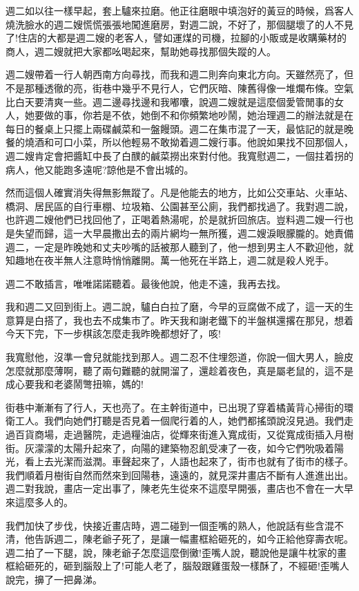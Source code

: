 \documentclass[a6paper]{article}
\begin{document}
週二如以往一樣早起，套上驢來拉磨。他正往磨眼中填泡好的黃豆的時候，爲客人燒洗臉水的週二嫂慌慌張張地闖進磨房，對週二說，不好了，那個腿壞了的人不見了!住店的大都是週二嫂的老客人，譬如運煤的司機，拉腳的小販或是收購藥材的商人，週二嫂就把大家都吆喝起來，幫助她尋找那個失蹤的人。

週二嫂帶着一行人朝西南方向尋找，而我和週二則奔向東北方向。天雖然亮了，但不是那種透徹的亮，街巷中幾乎不見行人，它們灰暗、陳舊得像一堆爛布條。空氣比白天要清爽一些。週二邊尋找邊和我嘟囔，說週二嫂就是這麼個愛管閒事的女人，她要做的事，你若是不依，她倒不和你頻繁地吵鬧，她治理週二的辦法就是在每日的餐桌上只擺上兩碟鹹菜和一盤饅頭。週二在集市混了一天，最惦記的就是晚餐的燒酒和可口小菜，所以他輕易不敢拗着週二嫂行事。他說如果找不回那個人，週二嫂肯定會把醬缸中長了白醭的鹹菜撈出來對付他。我寬慰週二，一個拄着拐的病人，他又能跑多遠呢?諒他是不會出城的。

然而這個人確實消失得無影無蹤了。凡是他能去的地方，比如公交車站、火車站、橋洞、居民區的自行車棚、垃圾箱、公園甚至公廁，我們都找過了。我對週二說，也許週二嫂他們已找回他了，正喝着熱湯呢，於是就折回旅店。豈料週二嫂一行也是失望而歸，這一大早晨撒出去的兩片網均一無所獲，週二嫂淚眼朦朧的。她責備週二，一定是昨晚她和丈夫吵嘴的話被那人聽到了，他一想到男主人不歡迎他，就知趣地在夜半無人注意時悄悄離開。萬一他死在半路上，週二就是殺人兇手。

週二不敢插言，唯唯諾諾聽着。最後他說，他走不遠，我再去找。

我和週二又回到街上。週二說，驢白白拉了磨，今早的豆腐做不成了，這一天的生意算是白搭了，我也去不成集市了。昨天我和謝老鐵下的半盤棋還撂在那兒，想着今天下完，下一步棋該怎麼走我昨晚都想好了，咳!

我寬慰他，沒準一會兒就能找到那人。週二忍不住埋怨道，你說一個大男人，臉皮怎麼就那麼薄啊，聽了兩句難聽的就開溜了，還趁着夜色，真是屬老鼠的，這不是成心要我和老婆鬧彆扭嘛，媽的!

街巷中漸漸有了行人，天也亮了。在主幹街道中，已出現了穿着橘黃背心掃街的環衛工人。我們向她們打聽是否見着一個爬行着的人，她們都搖頭說沒見過。我們走過百貨商場，走過醫院，走過糧油店，從輝來街進入寬成街，又從寬成街插入月樹街。灰濛濛的太陽升起來了，向陽的建築物忍飢受凍了一夜，如今它們吮吸着陽光，看上去光潔而滋潤。車聲起來了，人語也起來了，街市也就有了街市的樣子。我們順着月樹街自然而然來到回陽巷，遠遠的，就見深井畫店不斷有人進進出出。週二對我說，畫店一定出事了，陳老先生從來不這麼早開張，畫店也不會在一大早來這麼多人的。

我們加快了步伐，快接近畫店時，週二碰到一個歪嘴的熟人，他說話有些含混不清，他告訴週二，陳老爺子死了，是讓一幅畫框給砸死的，如今正給他穿壽衣呢。週二拍了一下腿，說，陳老爺子怎麼這麼倒黴!歪嘴人說，聽說他是讓牛枕家的畫框給砸死的，砸到腦殼上了!可能人老了，腦殼跟雞蛋殼一樣酥了，不經砸!歪嘴人說完，擤了一把鼻涕。
\end{document}

